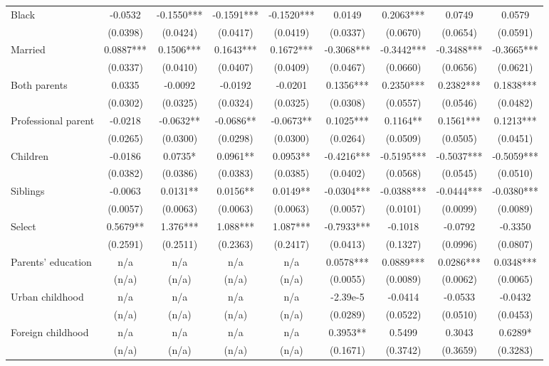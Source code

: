 \documentclass[12pt]{report}
\begin{document}
\begin{sidewaystable}
\begin{tabular}{lc|c|c|c|c|c|c|c}
Black & -0.0532 & -0.1550*** & -0.1591*** & -0.1520*** & 0.0149 & 0.2063*** & 0.0749 & 0.0579\\
& (0.0398) & (0.0424) & (0.0417) & (0.0419) & (0.0337) & (0.0670) & (0.0654) & (0.0591)\\
Married & 0.0887*** & 0.1506*** & 0.1643*** & 0.1672*** & -0.3068*** & -0.3442*** & -0.3488*** & -0.3665***\\
& (0.0337) & (0.0410) & (0.0407) & (0.0409) & (0.0467) & (0.0660) & (0.0656) & (0.0621)\\
Both parents & 0.0335 & -0.0092 & -0.0192 & -0.0201 & 0.1356*** & 0.2350*** & 0.2382*** & 0.1838***\\
& (0.0302) & (0.0325) & (0.0324) & (0.0325) & (0.0308) & (0.0557) & (0.0546) & (0.0482)\\
Professional parent & -0.0218 & -0.0632** & -0.0686** & -0.0673** & 0.1025*** & 0.1164** & 0.1561*** & 0.1213***\\
& (0.0265) & (0.0300) & (0.0298) & (0.0300) & (0.0264) & (0.0509) & (0.0505) & (0.0451)\\
Children & -0.0186 & 0.0735* & 0.0961** & 0.0953** & -0.4216*** & -0.5195*** & -0.5037*** & -0.5059***\\
& (0.0382) & (0.0386) & (0.0383) & (0.0385) & (0.0402) & (0.0568) & (0.0545) & (0.0510)\\
Siblings & -0.0063 & 0.0131** & 0.0156** & 0.0149** & -0.0304*** & -0.0388*** & -0.0444*** & -0.0380***\\
& (0.0057) & (0.0063) & (0.0063) & (0.0063) & (0.0057) & (0.0101) & (0.0099) & (0.0089)\\
Select & 0.5679** & 1.376*** & 1.088*** & 1.087*** & -0.7933*** & -0.1018 & -0.0792 & -0.3350\\
& (0.2591) & (0.2511) & (0.2363) & (0.2417) & (0.0413) & (0.1327) & (0.0996) & (0.0807)\\
Parents' education & n/a & n/a & n/a & n/a & 0.0578*** & 0.0889*** & 0.0286*** & 0.0348***\\
& (n/a) & (n/a) & (n/a) & (n/a) & (0.0055) & (0.0089) & (0.0062) & (0.0065)\\
Urban childhood & n/a & n/a & n/a & n/a & -2.39e-5 & -0.0414 & -0.0533 & -0.0432\\
& (n/a) & (n/a) & (n/a) & (n/a) & (0.0289) & (0.0522) & (0.0510) & (0.0453)\\
Foreign childhood & n/a & n/a & n/a & n/a & 0.3953** & 0.5499 & 0.3043 & 0.6289*\\
& (n/a) & (n/a) & (n/a) & (n/a) & (0.1671) & (0.3742) & (0.3659) & (0.3283)\\

\end{tabular}
\end{sidewaystable}
\end{document}
